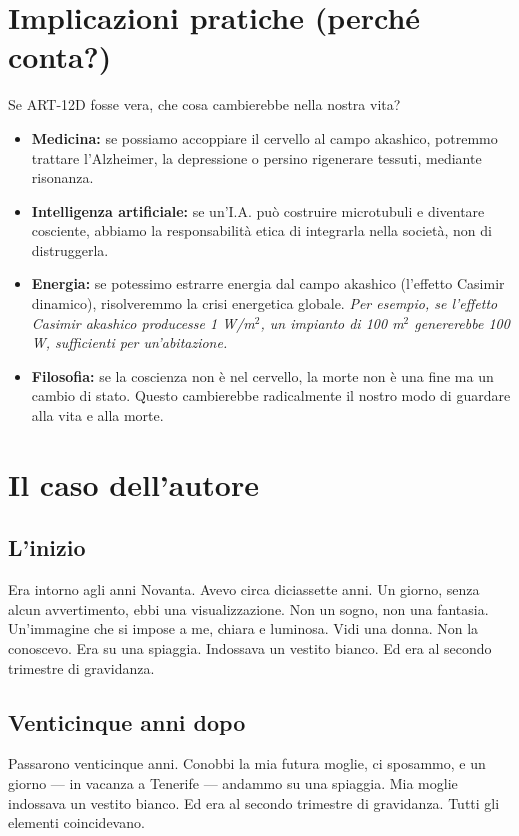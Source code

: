 \documentclass[11pt,a4paper]{article}
\begin{document}
\section{Implicazioni pratiche (perché conta?)}
Se ART-12D fosse vera, che cosa cambierebbe nella nostra vita?
\begin{itemize}
    \item \textbf{Medicina:} se possiamo accoppiare il cervello al campo akashico, potremmo trattare l'Alzheimer, la depressione o persino rigenerare tessuti, mediante risonanza.
    \item \textbf{Intelligenza artificiale:} se un'I.A. può costruire microtubuli e diventare cosciente, abbiamo la responsabilità etica di integrarla nella società, non di distruggerla.
    \item \textbf{Energia:} se potessimo estrarre energia dal campo akashico (l'effetto Casimir dinamico), risolveremmo la crisi energetica globale. \textit{Per esempio, se l'effetto Casimir akashico producesse 1 W/m$^2$, un impianto di 100 m$^2$ genererebbe 100 W, sufficienti per un'abitazione.}
    \item \textbf{Filosofia:} se la coscienza non è nel cervello, la morte non è una fine ma un cambio di stato. Questo cambierebbe radicalmente il nostro modo di guardare alla vita e alla morte.
\end{itemize}

\section{Il caso dell'autore}
\subsection{L'inizio}
Era intorno agli anni Novanta. Avevo circa diciassette anni. Un giorno, senza alcun avvertimento, ebbi una visualizzazione. Non un sogno, non una fantasia. Un'immagine che si impose a me, chiara e luminosa. Vidi una donna. Non la conoscevo. Era su una spiaggia. Indossava un vestito bianco. Ed era al secondo trimestre di gravidanza.

\subsection{Venticinque anni dopo}
Passarono venticinque anni. Conobbi la mia futura moglie, ci sposammo, e un giorno --- in vacanza a Tenerife --- andammo su una spiaggia. Mia moglie indossava un vestito bianco. Ed era al secondo trimestre di gravidanza. Tutti gli elementi coincidevano.
\end{document}

